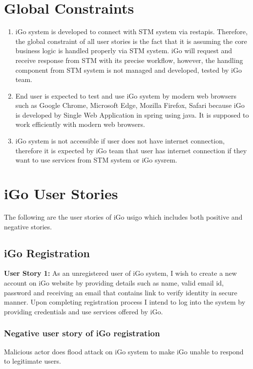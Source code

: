 \documentclass[11pt, english]{report}
\begin{document}
\section{Global Constraints}
\begin{enumerate}
    \item iGo system is developed to connect with STM system via \gls{restapi}s. Therefore, the global constraint of all user stories is the fact that it is assuming the core business logic is handled properly via STM system. iGo will request and receive response from STM with its precise workflow, however, the handling component from STM system is not managed and developed, tested by iGo team.
    \item End user is expected to test and use iGo system by modern web browsers such as Google Chrome, Microsoft Edge, Mozilla Firefox, Safari because iGo is developed by Single Web Application in \gls{spring} using \gls{java}. It is supposed to work efficiently with modern web browsers.
    \item iGo system is not accessible if user does not have internet connection, therefore it is expected by iGo team that user has internet connection if they want to use services from STM system or iGo sysrem.
\end{enumerate}

\section{iGo User Stories}
The following are the user stories\cite{userstory} of iGo \gls{usigo} which includes both positive and negative stories. 
\subsection{iGo Registration}
\textbf{User Story 1: }
As an unregistered user of iGo system, I wish to create a new account on iGo website by providing details such as name, valid email id, password and receiving an email that contains link to verify identity in secure manner. Upon completing registration process I intend to log into the system by providing credentials and use services offered by iGo.
\\
\subsubsection{Negative user story of iGo registration}

Malicious actor does flood attack on iGo system to make iGo unable to respond to legitimate users.
\end{document}
